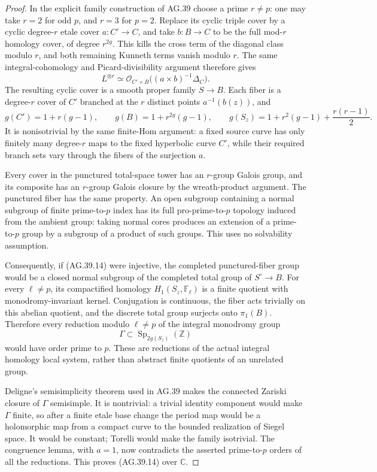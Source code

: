 \begin{proof}
In the explicit family construction of AG.39 choose a prime
\(r\ne p\): one may take \(r=2\) for odd \(p\), and
\(r=3\) for \(p=2\). Replace its cyclic triple cover by a
cyclic degree-\(r\) etale cover \(a:C'\to C\), and take
\(b:B\to C\) to be the full mod-\(r\) homology cover,
of degree \(r^{2g}\). This kills the cross term of the
diagonal class modulo \(r\), and both remaining Kunneth
terms vanish modulo \(r\). The same integral-cohomology and
Picard-divisibility argument therefore gives
\[
       L^{\otimes r}\simeq
       \mathcal O_{C'\times B}\bigl((a\times b)^{-1}\Delta_C\bigr).
\]
The resulting cyclic cover is a smooth proper family
\(S\to B\). Each fiber is a degree-\(r\) cover of \(C'\)
branched at the \(r\) distinct points \(a^{-1}(b(z))\), and
\[
   g(C')=1+r(g-1),\qquad g(B)=1+r^{2g}(g-1),\qquad
   g(S_z)=1+r^2(g-1)+\frac{r(r-1)}2.
\]
It is nonisotrivial by the same finite-Hom argument: a fixed
source curve has only finitely many degree-\(r\) maps to the
fixed hyperbolic curve \(C'\), while their required branch
sets vary through the fibers of the surjection \(a\).

Every cover in the punctured total-space tower has an
\(r\)-group Galois group, and its composite has an
\(r\)-group Galois closure by the wreath-product argument.
The punctured fiber has the same property. An open subgroup
containing a normal subgroup of finite prime-to-\(p\) index
has its full pro-prime-to-\(p\) topology induced from the
ambient group: taking normal cores produces an extension
of a prime-to-\(p\) group by a subgroup of a product of such
groups. This uses no solvability assumption.

Consequently, if (AG.39.14) were injective, the completed
punctured-fiber group would be a closed normal subgroup of
the completed total group of \(S^\circ\to B\). For every
\(\ell\ne p\), its compactified homology
\(H_1(S_z,\mathbb F_\ell)\) is a finite quotient with
monodromy-invariant kernel. Conjugation is continuous, the
fiber acts trivially on this abelian quotient, and the
discrete total group surjects onto \(\pi_1(B)\). Therefore
every reduction modulo \(\ell\ne p\) of the integral
monodromy group
\[
       \Gamma\subset\operatorname{Sp}_{2g(S_z)}(\mathbb Z)
\]
would have order prime to \(p\). These are reductions of
the actual integral homology local system, rather than
abstract finite quotients of an unrelated group.

Deligne's semisimplicity theorem used in AG.39 makes the
connected Zariski closure of \(\Gamma\) semisimple. It is
nontrivial: a trivial identity component would make
\(\Gamma\) finite, so after a finite etale base change the
period map would be a holomorphic map from a compact curve
to the bounded realization of Siegel space. It would be
constant; Torelli would make the family isotrivial. The
congruence lemma, with \(a=1\), now contradicts the asserted
prime-to-\(p\) orders of all the reductions. This proves
(AG.39.14) over \(\mathbb C\).


\end{proof}
